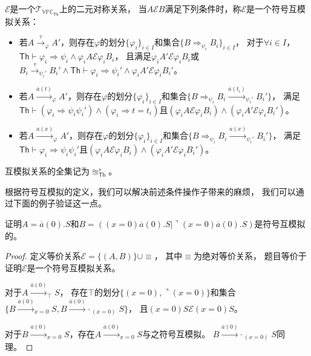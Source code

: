    \begin{definition}[符号互模拟]\label{def:symbolic_bisimulation}
      $\mathcal{E}$是一个$\mathcal{T}_{\mathbb{VPC}_{\mathsf{Th}}}$上的二元对称关系，
      当$A\mathcal{E}B$满足下列条件时，称$\mathcal{E}$是一个符号互模拟关系：
      \begin{itemize}
         \item {
            若$A\stackrel{\tau}{\rightarrow}_{\varphi} A'$，则存在$\varphi$的划分$\{\varphi_i\}_{i\in I}$和集合$\{B\Rightarrow_{\psi_i} B_i\}_{i\in I}$，
            对于$\forall i\in I$，$\mathsf{Th}\vdash \varphi_i\Rightarrow \psi_i\wedge \varphi_i A\mathcal{E} \varphi_i B_i$，
            且满足$\varphi_i A'\mathcal{E} \varphi_i B_i$或$B_i\stackrel{\tau}{\rightarrow}_{\psi_i'}B_i'\wedge \mathsf{Th}\vdash \varphi_i\Rightarrow \psi_i'\wedge \varphi_i A'\mathcal{E} \varphi_i B_i'$。
         }
         \item {
            若$A\stackrel{\overline{a}(t)}{\rightarrow}_{\varphi} A'$，则存在$\varphi$的划分$\{\varphi_i\}_{i\in I}$和集合$\{B\Rightarrow_{\psi_i}B_i\stackrel{\overline{a}(t_i)}{\rightarrow}_{\psi_i'}B_i'\}$，
            满足$\mathsf{Th}\vdash (\varphi_i\Rightarrow \psi_i\psi_i')\wedge (\varphi_i \Rightarrow t=t_i)$且$(\varphi_i A\mathcal{E}\varphi_i B_i)\wedge(\varphi_i A'\mathcal{E}\varphi_i B_i')$。
         }
         \item {
            若$A\stackrel{a(x)}{\rightarrow}_{\varphi} A'$，则存在$\varphi$的划分$\{\varphi_i\}_{i\in I}$和集合$\{B\Rightarrow_{\psi_i}B_i\stackrel{a(x)}{\rightarrow}_{\psi_i'}B_i'\}$，
            满足$\mathsf{Th}\vdash \varphi_i\Rightarrow \psi_i\psi_i'$且$(\varphi_i A\mathcal{E}\varphi_i B_i)\wedge(\varphi_i A'\mathcal{E}\varphi_i B_i')$。
         }
      \end{itemize}
      互模拟关系的全集记为$\approxeq_{\mathsf{Th}}^s$。
   \end{definition}

   根据符号互模拟的定义，我们可以解决前述条件操作子带来的麻烦，
   我们可以通过下面的例子验证这一点。
   \begin{example}
      证明$A=\overline{a}(0).S$和$B=((x=0) \overline{a}(0).S|\urcorner (x=0) \overline{a}(0).S)$是符号互模拟的。
   \end{example}
   \begin{proof}
      定义等价关系$\mathcal{E}=\{(A,B)\}\cup \equiv$，
      其中$\equiv$为绝对等价关系，
      题目等价于证明$\mathcal{E}$是一个符号互模拟关系。

      对于$A\stackrel{\overline{a}(0)}{\rightarrow}_{\top} S$，
      存在$\top$的划分$\{(x=0),\urcorner(x=0)\}$和集合
      $\{B\stackrel{\overline{a}(0)}{\longrightarrow}_{x=0}S, B\stackrel{\overline{a}(0)}{\longrightarrow}_{\urcorner(x=0)}S\}$，
      且$(x=0)S\mathcal{E}(x=0)S$。

      对于$B\stackrel{\overline{a}(0)}{\longrightarrow}_{x=0}S$，存在$A\stackrel{\overline{a}(0)}{\longrightarrow}_{x=0}S$与之符号互模拟。
      $B\stackrel{\overline{a}(0)}{\longrightarrow}_{\urcorner(x=0)}S$同理。
   \end{proof}

